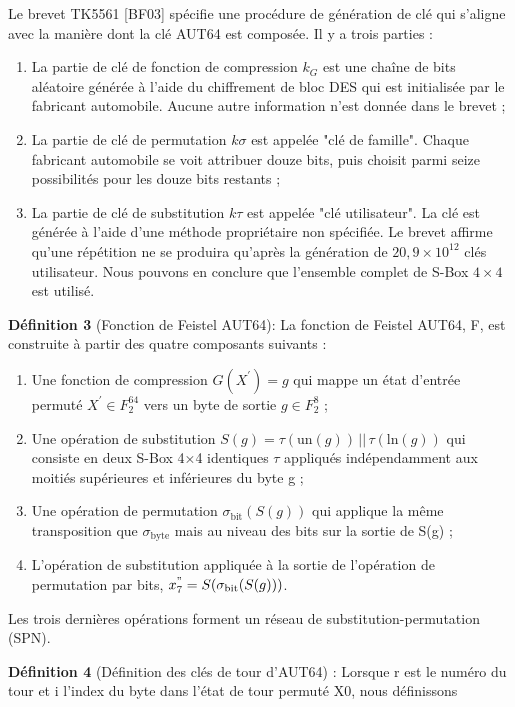 \documentclass{template}
\begin{document}
Le brevet TK5561 [BF03] spécifie une procédure de génération de clé qui s'aligne avec la manière dont la clé AUT64 est composée. Il y a trois parties :
\begin{enumerate} 
    \item La partie de clé de fonction de compression $k_G$ est une chaîne de bits aléatoire générée à l'aide du chiffrement de bloc DES qui est initialisée par le fabricant automobile. Aucune autre information n'est donnée dans le brevet ;
    \item La partie de clé de permutation $kσ$ est appelée "clé de famille". Chaque fabricant automobile se voit attribuer douze bits, puis choisit parmi seize possibilités pour les douze bits restants ;
    \item La partie de clé de substitution $kτ$ est appelée "clé utilisateur". La clé est générée à l'aide d'une méthode propriétaire non spécifiée. Le brevet affirme qu'une répétition ne se produira qu'après la génération de $20,9 \times  10^{12}$ clés utilisateur. Nous pouvons en conclure que l'ensemble complet de S-Box $4\times 4$ est utilisé.   
\end{enumerate} 

\textbf{Définition 3} (Fonction de Feistel AUT64): La fonction de Feistel AUT64, F, est construite à partir des quatre composants suivants :
\begin{enumerate}
    \item Une fonction de compression $G(X^{'}) = g$ qui mappe un état d'entrée permuté $X^{'} \in F_2^{64}$ vers un byte de sortie $g \in F_2^{8}$ ;
    \item Une opération de substitution  $S(g) = \tau(\text{un}(g)) \, || \, \tau(\text{ln}(g))$
 qui consiste en deux S-Box 4×4 identiques $\tau$  appliqués indépendamment aux moitiés supérieures et inférieures du byte g ;
    \item Une opération de permutation $\sigma_{\text{bit}}(S(g))$ qui applique la même transposition que $\sigma_{\text{byte}}$ mais au niveau des bits sur la sortie de S(g) ;
    \item L'opération de substitution appliquée à la sortie de l'opération de permutation par bits, $x_7^{"} = S(\sigma_{\text{bit}}(S(g)))$.
\end{enumerate}
Les trois dernières opérations forment un réseau de substitution-permutation (SPN).


\textbf{Définition 4} (Définition des clés de tour d'AUT64) : Lorsque r est le numéro du tour et i l'index du byte dans l'état de tour permuté X0, nous définissons
\end{document}
